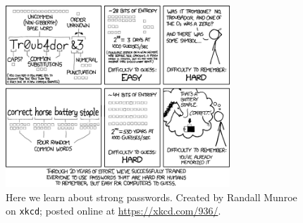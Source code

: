 \begin{figure}[t]
\centering
    \includegraphics[width=0.75\textwidth]{figures/xkcd/xkcd_936_password_strength.png}
    \caption[\texttt{xkcd} Password Strength]{Here we learn
        about strong passwords.
        Created by Randall Munroe on \texttt{xkcd};
        posted online at \url{https://xkcd.com/936/}.
        }
    \label{fig:xkcd_password_strength}
\end{figure}
